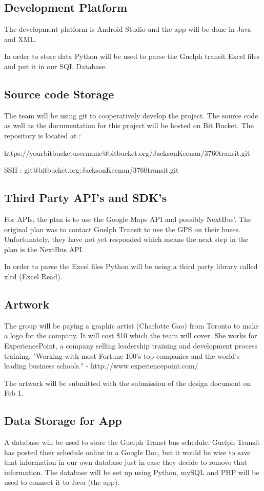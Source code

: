 \documentclass[a4paper,12pt]{article}
\begin{document}
\subsection{Development Platform}
The development platform is Android Studio and the app will be done in Java and XML.

In order to store data Python will be used to parse the Guelph transit Excel files and put it in our SQL Database.

\subsection{Source code Storage}
	The team will be using git to cooperatively develop the project. The source code as well
as the documentation for this project will be hosted on Bit 
Bucket.
The repository is located at :

https://yourbitbucketusername@bitbucket.org/JacksonKeenan/3760transit.git

SSH : git@bitbucket.org:JacksonKeenan/3760transit.git

\subsection{Third Party API's and SDK's}
	For APIs, the plan is to use the Google Maps API and possibly NextBus'. The original plan was to contact Guelph Transit to use the GPS on their buses.  Unfortunately, they have not yet responded which means the next step in the plan is the NextBus API.
	
	In order to parse the Excel files Python will be using a third party library called xlrd (Excel Read). 


\subsection{Artwork}
	The group will be paying a graphic artist (Charlotte Gao) from Toronto to make a logo for the company. It will cost \$10 which the team will cover. She works for ExperiencePoint, a company
 selling leadership training and development process training, 
 "Working with most Fortune 100's top companies and the world's leading business schools." 
 - http://www.experiencepoint.com/

The artwork will be submitted with the submission of the design document on Feb 1.

\subsection{Data Storage for App}
	A database will be used to store the Guelph Transt bus schedule.  Guelph Transit has 
posted their schedule online in a Google Doc, but it would be wise to save that 
information in our own database just in case they decide to remove that information. 
The database will be set up using Python, mySQL and PHP will be used to connect it to Java (the app).
\end{document}
